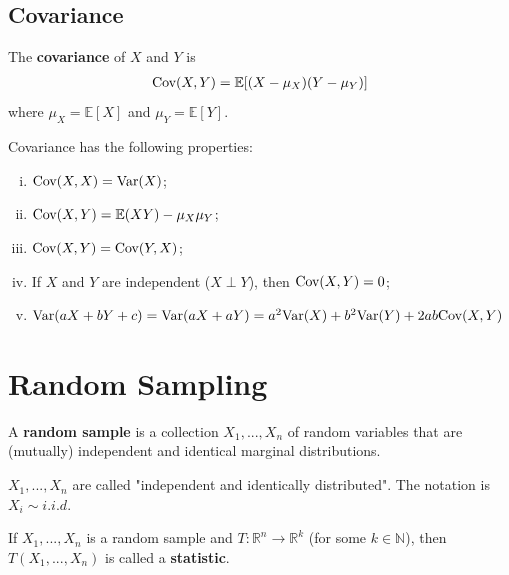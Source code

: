 \documentclass[11pt]{elegantbook}
\begin{document}
\subsection{Covariance}
\begin{definition}[Covariance]
    \normalfont
    The \textbf{covariance} of $X$ and $Y$ is
    \begin{equation}
        \begin{aligned}
            \textnormal{Cov}(X,Y)=\mathbb{E}[(X-\mu_X)(Y-\mu_Y)]
        \end{aligned}
        \nonumber
    \end{equation}
    where $\mu_X=\mathbb{E}[X]$ and $\mu_Y=\mathbb{E}[Y]$.
\end{definition}
\begin{proposition}
    Covariance has the following properties:
    \begin{enumerate}[(i).]
        \item $\textnormal{Cov}(X,X)=\textnormal{Var}(X)$;
        \item $\textnormal{Cov}(X,Y)=\mathbb{E}(XY)-\mu_X\mu_Y$;
        \item $\textnormal{Cov}(X,Y)=\textnormal{Cov}(Y,X)$;
        \item If $X$ and $Y$ are independent ($X\perp Y$), then $\textnormal{Cov}(X,Y)=0$;
        \item $\textnormal{Var}(aX+bY+c)=\textnormal{Var}(aX+aY)=a^2 \textnormal{Var}(X)+ b^2 \textnormal{Var}(Y)+2ab \textnormal{Cov}(X,Y)$
    \end{enumerate}
\end{proposition}


\section{Random Sampling}
\begin{definition}
    \normalfont
    A \textbf{random sample} is a collection $X_1,...,X_n$ of random variables that are (mutually) independent and identical marginal distributions.

    $X_1,...,X_n$ are called "independent and identically distributed". The notation is $X_i\sim i.i.d. $
\end{definition}

\begin{definition}[Statistic]
    \normalfont
    If $X_1,...,X_n$ is a random sample and $T: \mathbb{R}^n \rightarrow \mathbb{R}^k$ (for some $k\in \mathbb{N}$), then $T(X_1,...,X_n)$ is called a \textbf{statistic}.
\end{definition}
\end{document}
